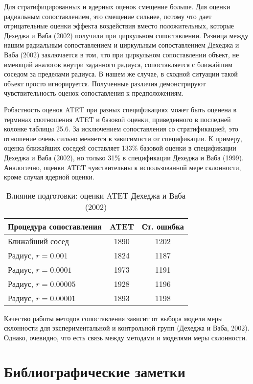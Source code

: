 Для стратифицированных и ядерных оценок смещение больше. Для оценки радиальным сопоставлением, это смещение сильнее, потому что дает отрицательные оценки эффекта воздействия вместо положительных, которые Дехеджа и Ваба (2002) получили при циркульном сопоставлении. Разница между нашим радиальным сопоставлением и циркульным сопоставлением Дехеджа и Ваба (2002) заключается в том, что при циркульном сопоставлении объект, не имеющий аналогов внутри заданного радиуса, сопоставляется с ближайшим соседом за пределами радиуса.  В нашем же случае, в сходной ситуации такой объект просто игнорируется. Полученные различия демонстрируют чувствительность оценок сопоставления к предположениям. 

Робастность оценок ATET при разных спецификациях может быть оценена в терминах соотношения ATET и базовой оценки, приведенного в последней колонке таблицы 25.6. За исключением сопоставления со стратификацией, это отношение очень сильно меняется в зависимости от спецификации. К примеру, оценка ближайших соседей составляет 133\% базовой оценки в спецификации Дехеджа и Ваба (2002), но только 31\% в спецификации Дехеджа и Ваба (1999). Аналогично, оценки ATET чувствительны к использованной мере склонности, кроме случая ядерной оценки. 

\begin{table}[h]
\caption{Влияние подготовки: оценки ATET Дехеджа и Ваба (2002)}
\begin{center}
\begin{tabular}{lcc}
\hline
\hline
Процедура сопоставления & ATET &  Ст. ошибка \\
\hline
Ближайший сосед & 1890 & 1202 \\
Радиус, $r = 0.001$ & 1824 & 1187 \\
Радиус, $r = 0.0001$ & 1973 & 1191 \\
Радиус, $r = 0.00005$ & 1928 & 1196 \\
Радиус, $r = 0.00001$ & 1893 & 1198 \\
\hline
\hline
\end{tabular}
\end{center}
\end{table}

Качество работы методов сопоставления зависит от выбора модели меры склонности для экспериментальной и контрольной групп (Дехеджа и Ваба, 2002). Однако, очевидно, что есть связь между методами и моделями меры склонности. 

\section{Библиографические заметки}

